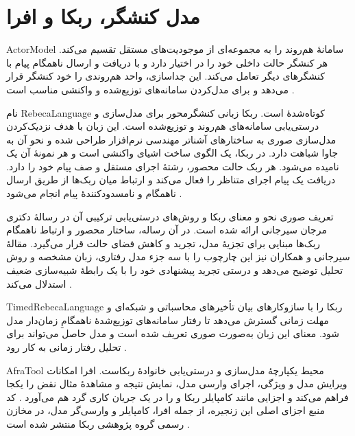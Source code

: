 \section{مدل کنشگر، ربکا و افرا}

\gls{ActorModel} سامانهٔ هم‌روند را به مجموعه‌ای از موجودیت‌های مستقل تقسیم می‌کند. هر کنشگر حالت داخلی خود را در اختیار دارد و با دریافت و ارسال ناهمگام پیام با کنشگرهای دیگر تعامل می‌کند. این جداسازی، واحد هم‌روندی را خود کنشگر قرار می‌دهد و برای مدل‌کردن سامانه‌های توزیع‌شده و واکنشی مناسب است \cite{SirjaniEtAl2004Rebeca,Sirjani2004Thesis}.

نام \gls{RebecaLanguage} کوتاه‌شدهٔ  است. ربکا زبانی کنشگرمحور برای مدل‌سازی و درستی‌یابی سامانه‌های هم‌روند و توزیع‌شده است. این زبان با هدف نزدیک‌کردن مدل‌سازی صوری به ساختارهای آشناتر مهندسی نرم‌افزار طراحی شده و نحو آن به جاوا شباهت دارد. در ربکا، یک  الگوی ساخت اشیای واکنشی است و هر نمونهٔ آن یک  نامیده می‌شود. هر ربک حالت محصور، رشتهٔ اجرای مستقل و صف پیام خود را دارد. دریافت یک پیام اجرای  متناظر را فعال می‌کند و ارتباط میان ربک‌ها از طریق ارسال ناهمگام و نامسدودکنندهٔ پیام انجام می‌شود \cite{Sirjani2004Thesis,SirjaniEtAl2004Rebeca}.

تعریف صوری نحو و معنای ربکا و روش‌های درستی‌یابی ترکیبی آن در رسالهٔ دکتری مرجان سیرجانی ارائه شده است. در آن رساله، ساختار محصور و ارتباط ناهمگام ربک‌ها مبنایی برای تجزیهٔ مدل، تجرید و کاهش فضای حالت قرار می‌گیرد. مقالهٔ سیرجانی و همکاران نیز این چارچوب را با سه جزء مدل رفتاری، زبان مشخصه و روش تحلیل توضیح می‌دهد و درستی تجرید پیشنهادی خود را با یک رابطهٔ شبیه‌سازی ضعیف استدلال می‌کند \cite{Sirjani2004Thesis,SirjaniEtAl2004Rebeca}.

\gls{TimedRebecaLanguage} ربکا را با سازوکارهای بیان تأخیرهای محاسباتی و شبکه‌ای و مهلت زمانی گسترش می‌دهد تا رفتار سامانه‌های توزیع‌شدهٔ ناهمگامِ زمان‌دار مدل شود. معنای این زبان به‌صورت صوری تعریف شده است و مدل حاصل می‌تواند برای تحلیل رفتار زمانی به کار رود \cite{ReynissonEtAl2014TimedRebeca}.

\gls{AfraTool} محیط یکپارچهٔ مدل‌سازی و درستی‌یابی خانوادهٔ ربکاست. افرا امکانات ویرایش مدل و ویژگی، اجرای وارسی مدل، نمایش نتیجه و مشاهدهٔ مثال نقض را یکجا فراهم می‌کند و اجزایی مانند کامپایلر ربکا و  را در یک جریان کاری گرد هم می‌آورد \cite{AfraWebsite2026}. کد منبع اجزای اصلی این زنجیره، از جمله افرا، کامپایلر و وارسی‌گر مدل، در مخازن رسمی گروه پژوهشی ربکا منتشر شده است \cite{RebecaGitHub2026,AfraGitHub2026,RebecaCompilerGitHub2026,RMCGitHub2026}.

